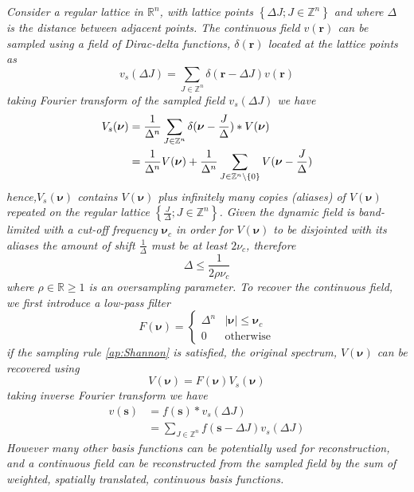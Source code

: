 \documentclass{article}
\begin{document}
\begin{enumerate}
\emph{Consider a regular lattice in $\mathbb R^n$, with lattice points $\left\lbrace \Delta J; J\in \mathbb Z^n\right\rbrace$ and where $\Delta$ is the distance between adjacent points. The continuous field $v(\mathbf r)$ can be sampled using a field of Dirac-delta functions, $\delta(\mathbf r)$ located at the lattice points as
\begin{equation}
 v_s(\Delta J)=\sum_{J \in \mathbb Z^n}\delta(\mathbf r-\Delta J)v(\mathbf r)
\end{equation}
taking Fourier transform of the sampled field $v_s(\Delta J)$ we have
\begin{align}
 V_s(\boldsymbol{\nu})&=\frac{1}{\Delta^n}\sum_{J\in\mathbb Z^n}\delta(\boldsymbol{\nu}-\frac{J}{\Delta})\ast V(\boldsymbol\nu)\\
&=\frac{1}{\Delta^n}V(\boldsymbol\nu)+\frac{1}{\Delta^n}\sum_{J\in\mathbb Z^n\setminus \mathbf \{0\}}V(\boldsymbol{\nu}-\frac{J}{\Delta})
\end{align}
hence,$V_s(\boldsymbol{\nu})$ contains $V(\boldsymbol\nu)$ plus infinitely many copies (aliases) of  $V(\boldsymbol\nu)$ repeated on the regular lattice $\left\lbrace \frac{J}{\Delta}; J\in \mathbb Z^n\right\rbrace$. Given the dynamic field is band-limited with a cut-off frequency $\boldsymbol\nu_c$ in order for $V(\boldsymbol\nu)$ to be disjointed with its aliases the amount of shift $\frac{1}{\Delta}$ must be at least $2\nu_c$, therefore
\begin{equation}\label{ap:Shannon}
	\Delta\le\frac{1}{2\rho\nu_c}
\end{equation}
where $\rho \in \mathbb{R} \ge 1$ is an oversampling parameter. To recover the continuous field, we first introduce a low-pass filter \begin{equation}
F(\boldsymbol \nu)=\begin{cases}
  \Delta^n & |\boldsymbol\nu|\le \boldsymbol\nu_c \\
0 & \text{otherwise}
\end{cases} 
\end{equation}
if the sampling rule \eqref{ap:Shannon} is satisfied, the original spectrum, $V(\boldsymbol\nu)$ can be recovered using
\begin{equation}
	V(\boldsymbol\nu)=F(\boldsymbol \nu)V_s(\boldsymbol\nu)
\end{equation}
taking inverse Fourier transform we have
\begin{align}
	v(\mathbf s)&=f(\mathbf s)\ast v_s(\Delta J) \\
	&= \sum_{J \in \mathbb Z^n}f(\mathbf s-\Delta J) v_s(\Delta J)
\end{align}
However many other basis functions can be potentially used for reconstruction, and a continuous field can be reconstructed from the sampled field by the sum of weighted, spatially translated, continuous  basis functions.}


\end{enumerate}
\end{document}
